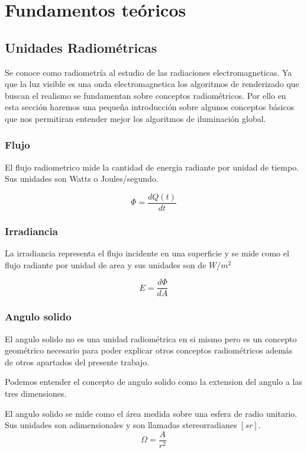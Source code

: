 \chapter{Fundamentos teóricos}

\section{Unidades Radiométricas}
Se conoce como radiometría al estudio de las radiaciones electromagneticas. Ya que la luz visible es una onda electromagnetica los algoritmos de renderizado que buscan el realismo se fundamentan sobre conceptos radiométricos. Por ello en esta sección haremos una pequeña introducción sobre algunos conceptos básicos que nos permitiran entender mejor los algoritmos de iluminación global.  
\subsection{Flujo}

El flujo radiometrico mide la cantidad de energia radiante por unidad de tiempo. Sus unidades son Watts o Joules/segundo.

\begin{equation}
\Phi = \frac{dQ(t)}{dt}
\end{equation}

\subsection{Irradiancia}
La irradiancia representa el flujo incidente en una superficie y se mide como el flujo radiante por unidad de area y sus unidades son de $W/m^2$ 

\begin{equation}
E = \frac{d\Phi}{dA}
\end{equation}

\clearpage

\subsection{Angulo solido}
El angulo solido no es una unidad radiométrica en si mismo pero es un concepto geométrico necesario para poder explicar otros conceptos radiométricos además de otros apartados del presente trabajo.

Podemos entender el concepto de angulo solido como la extension del angulo a las tres dimensiones.

El angulo solido se mide como el área medida sobre una esfera de radio unitario. Sus unidades son adimensionales y son llamadas stereorradianes $[sr]$.
\begin{equation}
\Omega = \frac{A}{r^2}
\end{equation}

